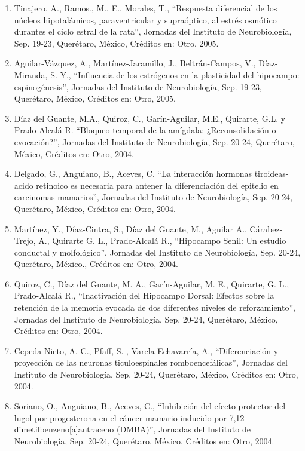 \begin{enumerate}
\item Tinajero, A., Ramos., M., E., Morales, T., “Respuesta diferencial de los núcleos hipotalámicos, paraventricular y 
supraóptico, al estrés osmótico durantes el ciclo estral de la rata”, Jornadas del Instituto de Neurobiología, Sep. 19-23, 
Querétaro, México, Créditos en: Otro, 2005.

\item Aguilar-Vázquez, A., Martínez-Jaramillo, J., Beltrán-Campos, V., Díaz-Miranda, S. Y., “Influencia de los estrógenos en 
la plasticidad del hipocampo: espinogénesis”, Jornadas del Instituto de Neurobiología, Sep. 19-23, Querétaro, México, 
Créditos en: Otro, 2005.

\item Díaz del Guante, M.A., Quiroz, C., Garín-Aguilar, M.E., Quirarte, G.L. y Prado-Alcalá R. “Bloqueo temporal de la 
amígdala: ¿Reconsolidación o evocación?”, Jornadas del Instituto de Neurobiología, Sep. 20-24, Querétaro, México, Créditos 
en: Otro, 2004.

\item Delgado, G., Anguiano, B., Aceves, C. “La interacción hormonas tiroideas-acido retinoico es necesaria para antener la 
diferenciación del epitelio en carcinomas mamarios”, Jornadas del Instituto de Neurobiología, Sep. 20-24, Querétaro, 
México, Créditos en: Otro, 2004.

\item Martínez, Y., Díaz-Cintra, S., Díaz del Guante, M., Aguilar A., Cárabez-Trejo, A., Quirarte G. L., Prado-Alcalá R., 
“Hipocampo Senil: Un estudio conductal y molfológico”, Jornadas del Instituto de Neurobiología, Sep. 20-24, Querétaro, 
México., Créditos en: Otro, 2004.

\item Quiroz, C., Díaz del Guante, M. A., Garín-Aguilar, M. E., Quirarte, G. L., Prado-Alcalá R., “Inactivación del Hipocampo 
Dorsal: Efectos sobre la retención de la memoria evocada de dos diferentes niveles de reforzamiento”, Jornadas del 
Instituto de Neurobiología, Sep. 20-24, Querétaro, México, Créditos en: Otro, 2004.

\item Cepeda Nieto, A. C., Pfaff, S. , Varela-Echavarría, A., “Diferenciación y proyección de las neuronas ticuloespinales 
romboencefálicas”, Jornadas del Instituto de Neurobiología, Sep. 20-24, Querétaro, México, Créditos en: Otro, 2004.

\item Soriano, O., Anguiano, B., Aceves, C., “Inhibición del efecto protector del lugol por progesterona en el cáncer mamario 
inducido por 7,12-dimetilbenzeno[a]antraceno (DMBA)”, Jornadas del Instituto de Neurobiología, Sep. 20-24, Querétaro, 
México, Créditos en: Otro, 2004.


\end{enumerate}
